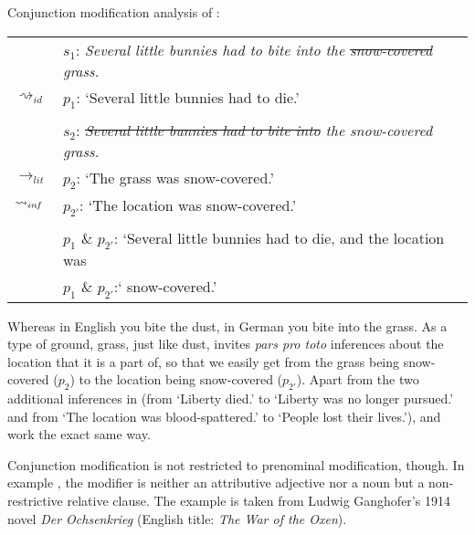 \documentclass[output=paper]{langsci/langscibook}
\begin{document}
\ea \label{analysis snow-covered grass} 
Conjunction modification analysis of : \\
\vspace{5pt}
\begin{tabular}{ll}
								& 	$s_{1}$: \hspace{4pt} \textit{Several little bunnies had to bite into the \sout{snow-covered} grass.} \\
$\rightsquigarrow_{id}$				&	$p_{1}$: \hspace{1pt} `Several little bunnies had to die.' \\
\vspace{-5pt} \\
								& 	$s_{2}$: \hspace{4pt} \textit{\sout{Several little bunnies had to bite into} the snow-covered grass.} \\
$\rightarrow_{lit}$					&	$p_{2}$: \hspace{1pt} `The grass was snow-covered.' \\
$\rightsquigarrow_{in\hspace{-0.8pt} f}$	&	$p_{2'}$: \hspace{-1.5pt} `The location was snow-covered.' \\
\vspace{-5pt} \\
								&	$p_{1}$ \& $p_{2'}$: `Several little bunnies had to die, and the location was \\
								&	{\white $p_{1}$ \& $p_{2'}$:`} snow-covered.'
\end{tabular}
\z

\noindent Whereas in English you bite the dust, in German you bite into the grass. As a type of ground, grass, just like dust, invites \textit{pars pro toto} inferences about the location that it is a part of, so that we easily get from the grass being snow-covered ($p_{2}$) to the location being snow-covered ($p_{2'}$). Apart from the two additional inferences in  (from `Liberty died.' to `Liberty was no longer pursued.' and from `The location was blood-spattered.' to `People lost their lives.'),  and  work the exact same way.

Conjunction modification is not restricted to prenominal modification, though. In example , the modifier is neither an attributive adjective nor a noun but a non-restrictive relative clause. The example is taken from Ludwig Ganghofer's 1914 novel \textit{Der Ochsenkrieg} (English title: \textit{The War of the Oxen}).
\end{document}
